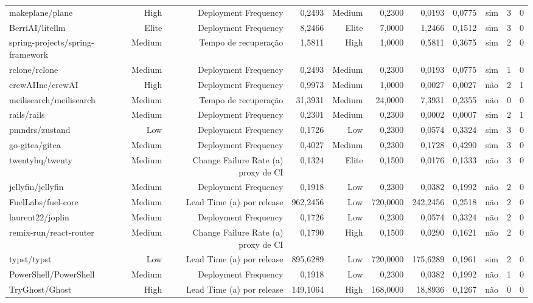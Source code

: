 \begin{tabular}{lrrrrrrrrrr}
makeplane/plane & High & Deployment Frequency & 0,2493 & Medium & 0,2300 & 0,0193 & 0,0775 & sim & 3 & 0 \\
BerriAI/litellm & Elite & Deployment Frequency & 8,2466 & Elite & 7,0000 & 1,2466 & 0,1512 & sim & 3 & 0 \\
spring-projects/spring-framework & Medium & Tempo de recuperação & 1,5811 & High & 1,0000 & 0,5811 & 0,3675 & sim & 2 & 0 \\
rclone/rclone & Medium & Deployment Frequency & 0,2493 & Medium & 0,2300 & 0,0193 & 0,0775 & sim & 1 & 0 \\
crewAIInc/crewAI & High & Deployment Frequency & 0,9973 & Medium & 1,0000 & 0,0027 & 0,0027 & não & 2 & 1 \\
meilisearch/meilisearch & Medium & Tempo de recuperação & 31,3931 & Medium & 24,0000 & 7,3931 & 0,2355 & não & 0 & 0 \\
rails/rails & Medium & Deployment Frequency & 0,2301 & Medium & 0,2300 & 0,0002 & 0,0007 & sim & 2 & 1 \\
pmndrs/zustand & Low & Deployment Frequency & 0,1726 & Low & 0,2300 & 0,0574 & 0,3324 & sim & 3 & 0 \\
go-gitea/gitea & Medium & Deployment Frequency & 0,4027 & Medium & 0,2300 & 0,1728 & 0,4290 & sim & 3 & 0 \\
twentyhq/twenty & Medium & Change Failure Rate (a) proxy de CI & 0,1324 & Elite & 0,1500 & 0,0176 & 0,1333 & não & 3 & 0 \\
jellyfin/jellyfin & Medium & Deployment Frequency & 0,1918 & Low & 0,2300 & 0,0382 & 0,1992 & não & 2 & 0 \\
FuelLabs/fuel-core & Medium & Lead Time (a) por release & 962,2456 & Low & 720,0000 & 242,2456 & 0,2518 & não & 2 & 0 \\
laurent22/joplin & Medium & Deployment Frequency & 0,1726 & Low & 0,2300 & 0,0574 & 0,3324 & não & 2 & 0 \\
remix-run/react-router & Medium & Change Failure Rate (a) proxy de CI & 0,1790 & High & 0,1500 & 0,0290 & 0,1621 & não & 2 & 0 \\
typst/typst & Low & Lead Time (a) por release & 895,6289 & Low & 720,0000 & 175,6289 & 0,1961 & sim & 2 & 0 \\
PowerShell/PowerShell & Medium & Deployment Frequency & 0,1918 & Low & 0,2300 & 0,0382 & 0,1992 & não & 1 & 0 \\
TryGhost/Ghost & High & Lead Time (a) por release & 149,1064 & High & 168,0000 & 18,8936 & 0,1267 & não & 0 & 0 \\

\end{tabular}
